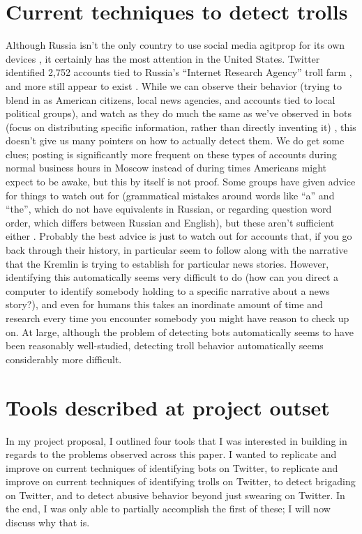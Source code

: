 \documentclass[11pt]{article}
\begin{document}
\section{Current techniques to detect trolls}
\label{troll-detect}
Although Russia isn't the only country to use social media agitprop for its own devices \cite{replyall}, it certainly has the most attention in the United States. Twitter identified 2,752 accounts tied to Russia's ``Internet Research Agency'' troll farm \cite{list}, and more still appear to exist \cite{hamilton}. While we can observe their behavior (trying to blend in as American citizens, local news agencies, and accounts tied to local political groups), and watch as they do much the same as we've observed in bots (focus on distributing specific information, rather than directly inventing it) \cite{neo}, this doesn't give us many pointers on how to actually detect them. We do get some clues; posting is significantly more frequent on these types of accounts during normal business hours in Moscow instead of during times Americans might expect to be awake, but this by itself is not proof. Some groups have given advice for things to watch out for (grammatical mistakes around words like ``a'' and ``the'', which do not have equivalents in Russian, or regarding question word order, which differs between Russian and English), but these aren't sufficient either \cite{dfrlab}. Probably the best advice is just to watch out for accounts that, if you go back through their history, in particular seem to follow along with the narrative that the Kremlin is trying to establish for particular news stories. However, identifying this automatically seems very difficult to do (how can you direct a computer to identify somebody holding to a specific narrative about a news story?), and even for humans this takes an inordinate amount of time and research every time you encounter somebody you might have reason to check up on. At large, although the problem of detecting bots automatically seems to have been reasonably well-studied, detecting troll behavior automatically seems considerably more difficult.

\section{Tools described at project outset}
\label{desired-tools}
In my project proposal, I outlined four tools that I was interested in building in regards to the problems observed across this paper. I wanted to replicate and improve on current techniques of identifying bots on Twitter, to replicate and improve on current techniques of identifying trolls on Twitter, to detect brigading on Twitter, and to detect abusive behavior beyond just swearing on Twitter. In the end, I was only able to partially accomplish the first of these; I will now discuss why that is.
\end{document}
